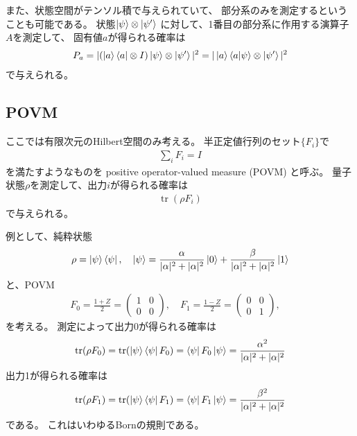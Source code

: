 \documentclass[]{ltjsarticle}
\DeclareMathOperator{\tr}{tr}
\begin{document}
また、状態空間がテンソル積で与えられていて、
部分系のみを測定するということも可能である。
状態$\ket{\psi}\otimes\ket{\psi'}$
に対して、1番目の部分系に作用する演算子$A$を測定して、
固有値$a$が得られる確率は
\begin{align}
    P_a 
    = |(\ket{a}\bra{a} \otimes I) \ket{\psi}\otimes\ket{\psi'}|^2
    = |\ket{a}\braket{a|\psi}\otimes\ket{\psi'}|^2
\end{align}
で与えられる。



\subsection{POVM}
ここでは有限次元のHilbert空間のみ考える。
半正定値行列のセット$\{F_i\}$で
\begin{align}
    \sum_i F_i = I
\end{align}
を満たすようなものを
positive operator-valued measure (POVM)
と呼ぶ。
量子状態$\rho$を測定して、出力$i$が得られる確率は
\begin{align}
    \tr(\rho F_i)    
\end{align}
で与えられる。

例として、純粋状態
\begin{align}
    \rho = \ket{\psi}\bra{\psi}, \quad 
    \ket{\psi} 
    =
    \frac{\alpha}{|\alpha|^2+|\alpha|^2} 
    \ket{0}   
    +
    \frac{\beta}{|\alpha|^2+|\alpha|^2}
    \ket{1}   
\end{align}
と、POVM
\begin{align}
    F_0 = \frac{1 + Z}{2}
    = \begin{pmatrix}
        1 & 0 \\ 0 & 0
    \end{pmatrix}, \quad 
    F_1 = \frac{1 - Z}{2} 
    = \begin{pmatrix}
        0 & 0 \\ 0 & 1
    \end{pmatrix}, \quad 
\end{align}
を考える。
測定によって出力0が得られる確率は
\begin{align}
    \tr(\rho F_0)
    =
    \tr(\ket{\psi}\bra{\psi} F_0)
    =
    \bra{\psi}F_0\ket{\psi}
    =
    \frac{\alpha^2}{|\alpha|^2+|\alpha|^2}
\end{align}
出力1が得られる確率は
\begin{align}
    \tr(\rho F_1)
    =
    \tr(\ket{\psi}\bra{\psi} F_1)
    =
    \bra{\psi}F_1\ket{\psi}
    =
    \frac{\beta^2}{|\alpha|^2+|\alpha|^2}
\end{align}
である。
これはいわゆるBornの規則である。
\end{document}
